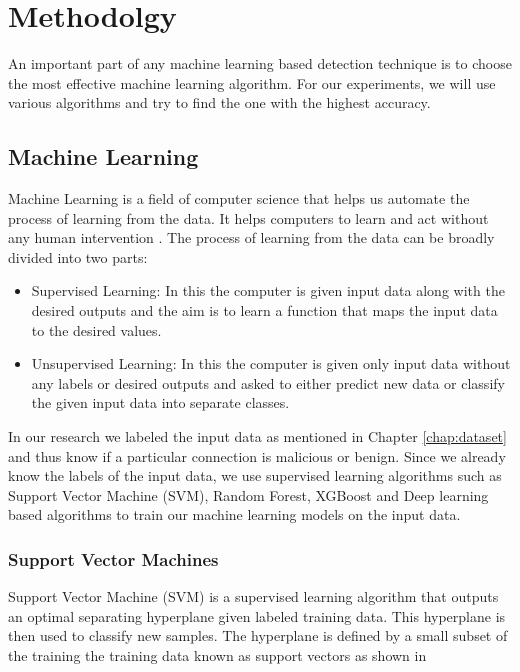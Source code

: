 \chapter{Methodolgy\label{chap:method}}

An important part of any machine learning based detection technique is to choose the most effective machine learning algorithm. For our experiments, we will use various algorithms and try to find the one with the highest accuracy.

\section{Machine Learning}

Machine Learning is a field of computer science that helps us automate the process of learning from the data. It helps computers to learn and act without any human intervention \cite{ML}. The process of learning from the data can be broadly divided into two parts:
\begin{itemize}
	\item Supervised Learning:
	In this the computer is given input data along with the desired outputs and the aim is to learn a function that maps the input data to the desired values.
	\item Unsupervised Learning:
	In this the computer is given only input data without any labels or desired outputs and asked to either predict new data or classify the given input data into separate classes.
\end{itemize}

In our research we labeled the input data as mentioned in Chapter \ref{chap:dataset} and thus know if a particular connection is malicious or benign. Since we already know the labels of the input data, we use supervised learning algorithms such as Support Vector Machine (SVM), Random Forest, XGBoost and Deep learning based algorithms to train our machine learning models on the input data.

\subsection{Support Vector Machines}

Support Vector Machine (SVM) is a supervised learning algorithm that outputs an optimal separating hyperplane given labeled training data. This hyperplane is then used to classify new samples. The hyperplane is defined by a small subset of the training the training data known as support vectors as shown in 

